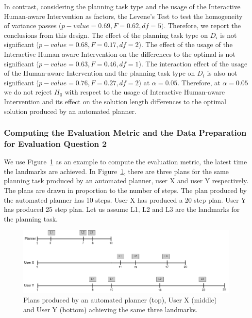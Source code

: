 In contrast, considering the planning task type and the usage of the Interactive Human-aware Intervention as factors, the Levene's Test to test the homogeneity of variance passes ($p-value=0.69, F=0.62, df=5)$.
Therefore, we report the conclusions from this design.
The effect of the planning task type on $D_i$ is not significant ($p-value=0.68, F=0.17, df=2$).
The effect of the usage of the Interactive Human-aware Intervention on the differences to the optimal is not significant ($p-value=0.63, F=0.46, df=1$).
The interaction effect of the usage of the Human-aware Intervention and the planning task type on $D_i$ is also not significant ($p-value=0.76, F=0.27, df=2$) at $\alpha=0.05$.
Therefore, at $\alpha=0.05$ we do not reject $H_0$ with respect to the usage of Interactive Human-aware Intervention and its effect on the solution length differences to the optimal solution produced by an automated planner.



\subsubsection{Computing the Evaluation Metric and the Data Preparation for Evaluation Question 2}
We use Figure~\ref{fig:latest} as an example to compute the evaluation metric, the latest time the landmarks are achieved.
In Figure~\ref{fig:latest}, there are three plans for the same planning task produced by an automated planner, user X and user Y respectively.
The plans are drawn in proportion to the number of steps.
The plan produced by the automated planner has 10 steps.
User X has produced a 20 step plan.
User Y has produced 25 step plan.
Let us assume L1, L2 and L3 are the landmarks for the planning task.
\begin{figure}[tpb]
  \centering
\includegraphics[width=\columnwidth]{img/latest.png}
  \caption{Plans produced by an automated planner (top), User X (middle) and User Y (bottom) achieving the same three landmarks.}
  \label{fig:latest}
\end{figure}

\begin{table}[tpb]
\centering
\caption{Latest Landmark Achievement Times}
\label{tab:latest}
\end{table}

